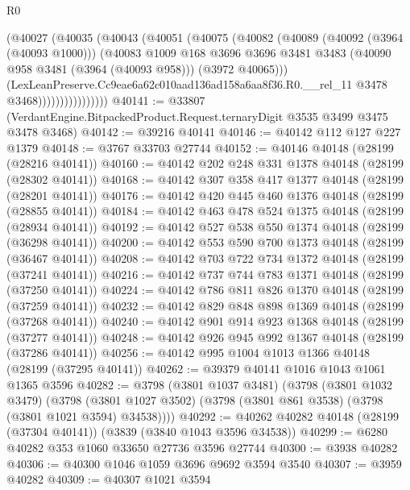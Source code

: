 \begin{lexlean}{R0}
\begin{coremodule}
                      (@40027
                        (@40035
                          (@40043
                            (@40051
                              (@40075
                                (@40082
                                  (@40089
                                    (@40092 (@3964 (@40093 @1000)))
                                    (@40083
                                      @1009
                                      @168
                                      @3696
                                      @3696
                                      @3481
                                      @3483
                                      (@40090 @958 @3481 (@3964 (@40093 @958)))
                                      (@3972 @40065)))
                                  (LexLeanPreserve.Cc9eae6a62c010aad136ad158a6aa8f36.R0.__rel_11
                                    @3478
                                    @3468))))))))))))))))
@40141 := @33807 (VerdantEngine.BitpackedProduct.Request.ternaryDigit @3535 @3499 @3475 @3478 @3468)
@40142 := @39216 @40141
@40146 := @40142 @112 @127 @227 @1379
@40148 := @3767 @33703 @27744
@40152 := @40146 @40148 (@28199 (@28216 @40141))
@40160 := @40142 @202 @248 @331 @1378 @40148 (@28199 (@28302 @40141))
@40168 := @40142 @307 @358 @417 @1377 @40148 (@28199 (@28201 @40141))
@40176 := @40142 @420 @445 @460 @1376 @40148 (@28199 (@28855 @40141))
@40184 := @40142 @463 @478 @524 @1375 @40148 (@28199 (@28934 @40141))
@40192 := @40142 @527 @538 @550 @1374 @40148 (@28199 (@36298 @40141))
@40200 := @40142 @553 @590 @700 @1373 @40148 (@28199 (@36467 @40141))
@40208 := @40142 @703 @722 @734 @1372 @40148 (@28199 (@37241 @40141))
@40216 := @40142 @737 @744 @783 @1371 @40148 (@28199 (@37250 @40141))
@40224 := @40142 @786 @811 @826 @1370 @40148 (@28199 (@37259 @40141))
@40232 := @40142 @829 @848 @898 @1369 @40148 (@28199 (@37268 @40141))
@40240 := @40142 @901 @914 @923 @1368 @40148 (@28199 (@37277 @40141))
@40248 := @40142 @926 @945 @992 @1367 @40148 (@28199 (@37286 @40141))
@40256 := @40142 @995 @1004 @1013 @1366 @40148 (@28199 (@37295 @40141))
@40262 := @39379 @40141 @1016 @1043 @1061 @1365 @3596
@40282 := @3798
    (@3801 @1037 @3481)
    (@3798
      (@3801 @1032 @3479)
      (@3798 (@3801 @1027 @3502) (@3798 (@3801 @861 @3538) (@3798 (@3801 @1021 @3594) @34538))))
@40292 := @40262 @40282 @40148 (@28199 (@37304 @40141)) (@3839 (@3840 @1043 @3596 @34538))
@40299 := @6280 @40282 @353 @1060 @33650 @27736 @3596 @27744
@40300 := @3938 @40282
@40306 := @40300 @1046 @1059 @3696 @9692 @3594 @3540
@40307 := @3959 @40282
@40309 := @40307 @1021 @3594

\end{coremodule}
\end{lexlean}
